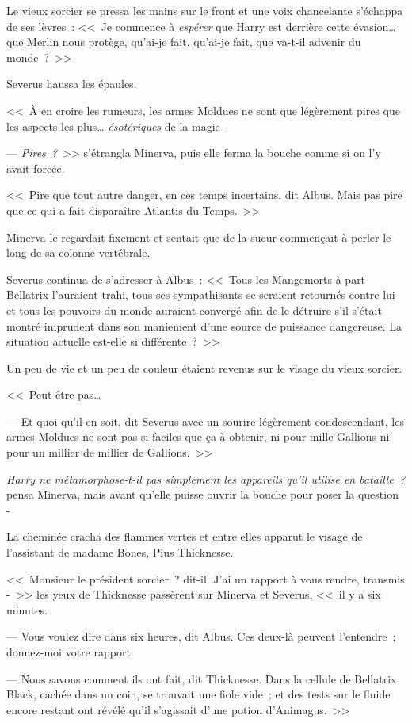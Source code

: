 Le vieux sorcier se pressa les mains sur le front et une voix chancelante s'échappa de ses lèvres~: <<~Je commence à \emph{espérer} que Harry est derrière cette évasion… que Merlin nous protège, qu'ai-je fait, qu'ai-je fait, que va-t-il advenir du monde~?~>>

Severus haussa les épaules.

<<~À en croire les rumeurs, les armes Moldues ne sont que légèrement pires que les aspects les plus… \emph{ésotériques} de la magie -

--- \emph{Pires~?}~>> s'étrangla Minerva, puis elle ferma la bouche comme si on l'y avait forcée.

<<~Pire que tout autre danger, en ces temps incertains, dit Albus. Mais pas pire que ce qui a fait disparaître Atlantis du Temps.~>>

Minerva le regardait fixement et sentait que de la sueur commençait à perler le long de sa colonne vertébrale.

Severus continua de s'adresser à Albus~: <<~Tous les Mangemorts à part Bellatrix l'auraient trahi, tous ses sympathisants se seraient retournés contre lui et tous les pouvoirs du monde auraient convergé afin de le détruire s'il s'était montré imprudent dans son maniement d'une source de puissance dangereuse. La situation actuelle est-elle si différente~?~>>

Un peu de vie et un peu de couleur étaient revenus sur le visage du vieux sorcier.

<<~Peut-être pas…

--- Et quoi qu'il en soit, dit Severus avec un sourire légèrement condescendant, les armes Moldues ne sont pas si faciles que ça à obtenir, ni pour mille Gallions ni pour un millier de millier de Gallions.~>>

\emph{Harry ne métamorphose-t-il pas simplement les appareils qu'il utilise en bataille~?} pensa Minerva, mais avant qu'elle puisse ouvrir la bouche pour poser la question -

La cheminée cracha des flammes vertes et entre elles apparut le visage de l'assistant de madame Bones, Pius Thicknesse.

<<~Monsieur le président sorcier~? dit-il. J'ai un rapport à vous rendre, transmis -~>> les yeux de Thicknesse passèrent sur Minerva et Severus, <<~il y a six minutes.

--- Vous voulez dire dans six heures, dit Albus. Ces deux-là peuvent l'entendre~; donnez-moi votre rapport.

--- Nous savons comment ils ont fait, dit Thicknesse. Dans la cellule de Bellatrix Black, cachée dans un coin, se trouvait une fiole vide~; et des tests sur le fluide encore restant ont révélé qu'il s'agissait d'une potion d'Animagus.~>>

